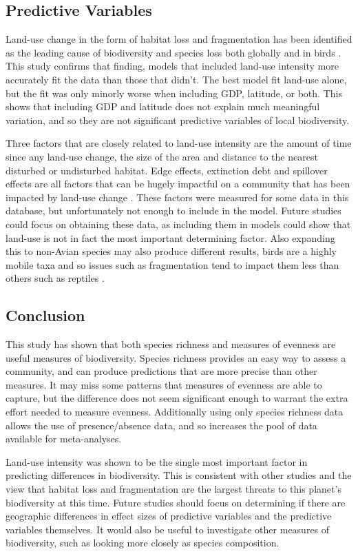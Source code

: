 \documentclass[11pt]{article}
\begin{document}
\subsection{Predictive Variables}

Land-use change in the form of habitat loss and fragmentation has been identified as the leading cause of biodiversity and species loss both globally and in birds \parencite{Gaston2003,Dirzo2004}. This study confirms that finding, models that included land-use intensity more accurately fit the data than those that didn't. The best model fit land-use alone, but the fit was only minorly worse when including GDP, latitude, or both. This shows that including GDP and latitude does not explain much meaningful variation, and so they are not significant predictive variables of local biodiversity. 

Three factors that are closely related to land-use intensity are the amount of time since any land-use change, the size of the area and distance to the nearest disturbed or undisturbed habitat. Edge effects, extinction debt and spillover effects are all factors that can be hugely impactful on a community that has been impacted by land-use change \parencite{Banks-Leite2010, Ford2009, Robinson1995}. These factors were measured for some data in this database, but unfortunately not enough to include in the model. Future studies could focus on obtaining these data, as including them in models could show that land-use is not in fact the most important determining factor. Also expanding this to non-Avian species may also produce different results, birds are a highly mobile taxa and so issues such as fragmentation tend to impact them less than others such as reptiles \parencite{Keinath2017, Villard1994}.

\newpage
\subsection*{\Large Conclusion}
This study has shown that both species richness and measures of evenness are useful measures of biodiversity. Species richness provides an easy way to assess a community, and can produce predictions that are more precise than other measures. It may miss some patterns that measures of evenness are able to capture, but the difference does not seem significant enough to warrant the extra effort needed to measure evenness. Additionally using only species richness data allows the use of presence/absence data, and so increases the pool of data available for meta-analyses. 

Land-use intensity was shown to be the single most important factor in predicting differences in biodiversity. This is consistent with other studies and the view that habitat loss and fragmentation are the largest threats to this planet's biodiversity at this time. Future studies should focus on determining if there are geographic differences in effect sizes of predictive variables and the predictive variables themselves. It would also be useful to investigate other measures of biodiversity, such as looking more closely as species composition.

\newpage

\printbibliography
\end{document}
